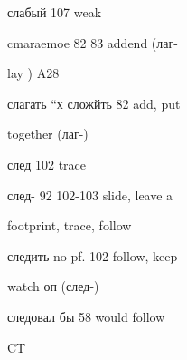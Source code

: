 \begin{minipage}[t]{0.475\textwidth}
\noindent слабый 107 weak\par
\noindent cmaraemoe 82 83 addend (лаг-\par
\noindent lay ) A28\par
\noindent слагать “х сложйть 82 add, put\par
\noindent together (лаг-)\par
\noindent след 102 trace\par
\noindent след- 92 102-103 slide, leave a\par
\noindent footprint, trace, follow\par
\noindent следить no pf. 102 follow, keep\par
\noindent watch оп (след-)\par
\noindent следовал бы 58 would follow\par
\noindent CT\par
\end{minipage}
\endgroup

